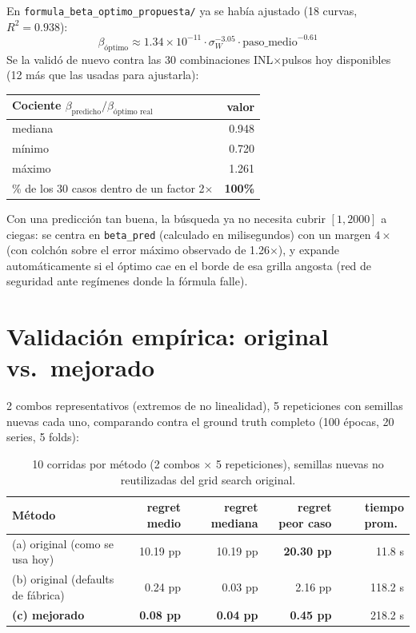 \documentclass[11pt]{article}
\begin{document}
En \texttt{formula\_beta\_optimo\_propuesta/} ya se había ajustado (18 curvas, $R^2=0.938$):
\[
\beta_{\text{óptimo}} \approx 1.34\times10^{-11}\cdot\sigma_W^{-3.05}\cdot\text{paso\_medio}^{-0.61}
\]
Se la validó de nuevo contra las 30 combinaciones INL$\times$pulsos hoy disponibles (12 más
que las usadas para ajustarla):

\begin{table}[htbp]
\centering
\begin{tabular}{@{}lr@{}}
\toprule
Cociente $\beta_{\text{predicho}}/\beta_{\text{óptimo real}}$ & valor \\
\midrule
mediana & 0.948 \\
mínimo & 0.720 \\
máximo & 1.261 \\
\% de los 30 casos dentro de un factor 2$\times$ & \textbf{100\%} \\
\bottomrule
\end{tabular}
\end{table}

Con una predicción tan buena, la búsqueda ya no necesita cubrir $[1,2000]$ a ciegas: se centra
en \texttt{beta\_pred} (calculado en milisegundos) con un margen $4\times$ (con colchón sobre
el error máximo observado de 1.26$\times$), y expande automáticamente si el óptimo cae en el
borde de esa grilla angosta (red de seguridad ante regímenes donde la fórmula falle).

\section{Validación empírica: original vs.\ mejorado}

2 combos representativos (extremos de no linealidad), 5 repeticiones con semillas nuevas cada
uno, comparando contra el ground truth completo (100 épocas, 20 series, 5 folds):

\begin{table}[htbp]
\centering
\begin{tabular}{@{}lrrrr@{}}
\toprule
Método & regret medio & regret mediana & \textbf{regret peor caso} & tiempo prom.\ \\
\midrule
(a) original (como se usa hoy) & 10.19 pp & 10.19 pp & \textbf{20.30 pp} & 11.8 s \\
(b) original (defaults de fábrica) & 0.24 pp & 0.03 pp & 2.16 pp & 118.2 s \\
\textbf{(c) mejorado} & \textbf{0.08 pp} & \textbf{0.04 pp} & \textbf{0.45 pp} & 218.2 s \\
\bottomrule
\end{tabular}
\caption{10 corridas por método (2 combos $\times$ 5 repeticiones), semillas nuevas no
reutilizadas del grid search original.}
\end{table}
\end{document}
